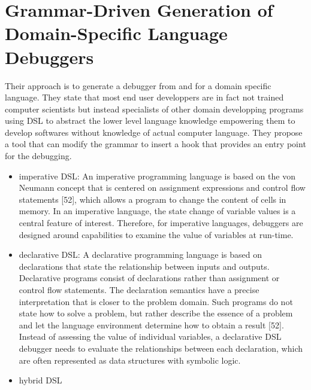 \section{Grammar-Driven Generation of Domain-Specific Language Debuggers}

Their approach is to generate a debugger from and for a domain specific language. They state that most end user developpers are in fact not trained computer scientists but instead specialists of other domain developping programs using DSL to abstract the lower level language knowledge empowering them to develop softwares without knowledge of actual computer language. They propose a tool that can modify the grammar to insert a hook that provides an entry point for the debugging.

\begin{itemize}
 	\item imperative DSL: An imperative programming language is based on the von Neumann concept that is centered on assignment expressions and control flow statements [52], which allows a program to change the content of cells in memory. In an imperative language, the state change of variable values is a central feature of interest. Therefore, for imperative languages, debuggers are designed around capabilities to examine the value of variables at run-time.
 	\item declarative DSL: A declarative programming language is based on declarations that state the relationship between inputs and outputs. Declarative programs consist of declarations rather than assignment or control flow statements. The declaration semantics have a precise interpretation that is closer to the problem domain. Such programs do not state how to solve a problem, but rather describe the essence of a problem and let the language environment determine how to obtain a result [52]. Instead of assessing the value of individual variables, a declarative DSL debugger needs to evaluate the relationships between each declaration, which are often represented as data structures with symbolic logic.
 	\item hybrid DSL
\end{itemize}
